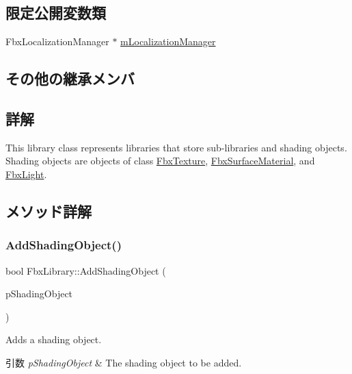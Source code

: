 \subsection*{限定公開変数類}
\begin{DoxyCompactItemize}
\item 
Fbx\+Localization\+Manager $\ast$ \hyperlink{class_fbx_library_ac240173ce32053acf9cc390b82dc69e5}{m\+Localization\+Manager}
\end{DoxyCompactItemize}
\subsection*{その他の継承メンバ}


\subsection{詳解}
This library class represents libraries that store sub-\/libraries and shading objects. Shading objects are objects of class \hyperlink{class_fbx_texture}{Fbx\+Texture}, \hyperlink{class_fbx_surface_material}{Fbx\+Surface\+Material}, and \hyperlink{class_fbx_light}{Fbx\+Light}. 

\subsection{メソッド詳解}
\mbox{\label{class_fbx_library_a041b82a3689dbf2912d81d0f69218ab7}} 
\subsubsection{\texorpdfstring{Add\+Shading\+Object()}{AddShadingObject()}}
{\footnotesize\ttfamily bool Fbx\+Library\+::\+Add\+Shading\+Object (\begin{DoxyParamCaption}\item[{\hyperlink{class_fbx_object}{Fbx\+Object} $\ast$}]{p\+Shading\+Object }\end{DoxyParamCaption})}

Adds a shading object. 
\begin{DoxyParams}{引数}
{\em p\+Shading\+Object} & The shading object to be added. \\
\hline
\end{DoxyParams}
\mbox{\label{class_fbx_library_a0c3b1e44376fbbad1d85d35aadcedec4}} 
